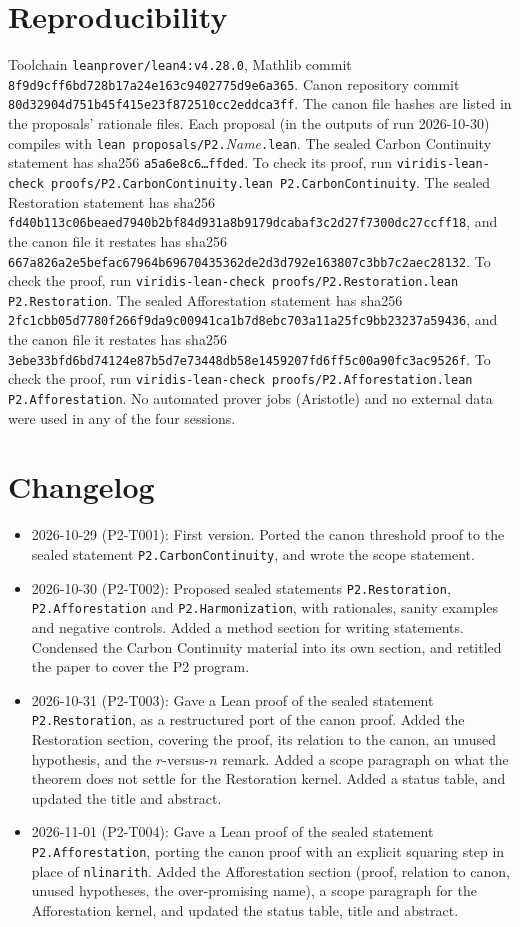 \documentclass[11pt]{article}
\theoremstyle{definition}
\theoremstyle{remark}
\begin{document}
\section{Reproducibility}
Toolchain \texttt{leanprover/lean4:v4.28.0}, Mathlib commit \texttt{8f9d9cff6bd728b17a24e163c9402775d9e6a365}.
Canon repository commit \texttt{80d32904d751b45f415e23f872510cc2eddca3ff}. The canon file hashes are listed in the proposals' rationale files.
Each proposal (in the outputs of run 2026-10-30) compiles with \texttt{lean proposals/P2.}\textit{Name}\texttt{.lean}.
The sealed Carbon Continuity statement has sha256 \texttt{a5a6e8c6\ldots ffded}. To check its proof, run
\texttt{viridis-lean-check proofs/P2.CarbonContinuity.lean P2.CarbonContinuity}.
The sealed Restoration statement has sha256 \texttt{fd40b113c06beaed7940b2bf84d931a8b9179dcabaf3c2d27f7300dc27ccff18},
and the canon file it restates has sha256 \texttt{667a826a2e5befac67964b69670435362de2d3d792e163807c3bb7c2aec28132}.
To check the proof, run \texttt{viridis-lean-check proofs/P2.Restoration.lean P2.Restoration}.
The sealed Afforestation statement has sha256 \texttt{2fc1cbb05d7780f266f9da9c00941ca1b7d8ebc703a11a25fc9bb23237a59436},
and the canon file it restates has sha256 \texttt{3ebe33bfd6bd74124e87b5d7e73448db58e1459207fd6ff5c00a90fc3ac9526f}.
To check the proof, run \texttt{viridis-lean-check proofs/P2.Afforestation.lean P2.Afforestation}.
No automated prover jobs (Aristotle) and no external data were used in any of the four sessions.

\section{Changelog}
\begin{itemize}
\item 2026-10-29 (P2-T001): First version. Ported the canon threshold proof to the sealed statement
\texttt{P2.CarbonContinuity}, and wrote the scope statement.
\item 2026-10-30 (P2-T002): Proposed sealed statements \texttt{P2.Restoration}, \texttt{P2.Afforestation} and \texttt{P2.Harmonization},
with rationales, sanity examples and negative controls. Added a method section for writing statements.
Condensed the Carbon Continuity material into its own section, and retitled the paper to cover the P2 program.
\item 2026-10-31 (P2-T003): Gave a Lean proof of the sealed statement \texttt{P2.Restoration}, as a restructured port of the canon
proof. Added the Restoration section, covering the proof, its relation to the canon, an unused hypothesis, and the $r$-versus-$n$ remark.
Added a scope paragraph on what the theorem does not settle for the Restoration kernel. Added a status table, and updated the title and abstract.
\item 2026-11-01 (P2-T004): Gave a Lean proof of the sealed statement \texttt{P2.Afforestation}, porting the canon proof with
an explicit squaring step in place of \texttt{nlinarith}. Added the Afforestation section (proof, relation to canon, unused hypotheses,
the over-promising name), a scope paragraph for the Afforestation kernel, and updated the status table, title and abstract.
\end{itemize}



\end{document}
